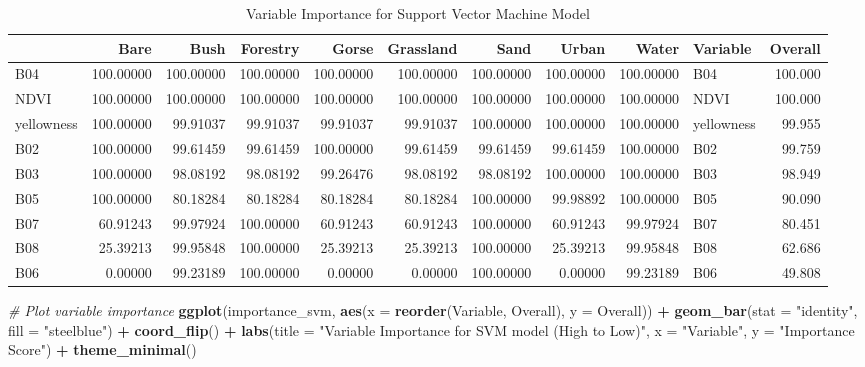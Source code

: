 \documentclass[
]{article}
\newenvironment{Shaded}{\begin{snugshade}}{\end{snugshade}}
\newcommand{\AttributeTok}[1]{\textcolor[rgb]{0.13,0.29,0.53}{#1}}
\newcommand{\CommentTok}[1]{\textcolor[rgb]{0.56,0.35,0.01}{\textit{#1}}}
\newcommand{\FunctionTok}[1]{\textcolor[rgb]{0.13,0.29,0.53}{\textbf{#1}}}
\newcommand{\NormalTok}[1]{#1}
\newcommand{\SpecialCharTok}[1]{\textcolor[rgb]{0.81,0.36,0.00}{\textbf{#1}}}
\newcommand{\StringTok}[1]{\textcolor[rgb]{0.31,0.60,0.02}{#1}}
\begin{document}
\begin{longtable}[l]{lrrrrrrrrlr}
\caption{\label{tab:svm_summary}Variable Importance for Support Vector Machine Model}\\
\toprule
 & Bare & Bush & Forestry & Gorse & Grassland & Sand & Urban & Water & Variable & Overall\\
\midrule
B04 & 100.00000 & 100.00000 & 100.00000 & 100.00000 & 100.00000 & 100.00000 & 100.00000 & 100.00000 & B04 & 100.000\\
NDVI & 100.00000 & 100.00000 & 100.00000 & 100.00000 & 100.00000 & 100.00000 & 100.00000 & 100.00000 & NDVI & 100.000\\
yellowness & 100.00000 & 99.91037 & 99.91037 & 99.91037 & 99.91037 & 100.00000 & 100.00000 & 100.00000 & yellowness & 99.955\\
B02 & 100.00000 & 99.61459 & 99.61459 & 100.00000 & 99.61459 & 99.61459 & 99.61459 & 100.00000 & B02 & 99.759\\
B03 & 100.00000 & 98.08192 & 98.08192 & 99.26476 & 98.08192 & 98.08192 & 100.00000 & 100.00000 & B03 & 98.949\\
\addlinespace
B05 & 100.00000 & 80.18284 & 80.18284 & 80.18284 & 80.18284 & 100.00000 & 99.98892 & 100.00000 & B05 & 90.090\\
B07 & 60.91243 & 99.97924 & 100.00000 & 60.91243 & 60.91243 & 100.00000 & 60.91243 & 99.97924 & B07 & 80.451\\
B08 & 25.39213 & 99.95848 & 100.00000 & 25.39213 & 25.39213 & 100.00000 & 25.39213 & 99.95848 & B08 & 62.686\\
B06 & 0.00000 & 99.23189 & 100.00000 & 0.00000 & 0.00000 & 100.00000 & 0.00000 & 99.23189 & B06 & 49.808\\
\bottomrule
\end{longtable}

\begin{Shaded}
\begin{Highlighting}[]
\CommentTok{\# Plot variable importance}
\FunctionTok{ggplot}\NormalTok{(importance\_svm, }\FunctionTok{aes}\NormalTok{(}\AttributeTok{x =} \FunctionTok{reorder}\NormalTok{(Variable, Overall), }\AttributeTok{y =}\NormalTok{ Overall)) }\SpecialCharTok{+}
  \FunctionTok{geom\_bar}\NormalTok{(}\AttributeTok{stat =} \StringTok{"identity"}\NormalTok{, }\AttributeTok{fill =} \StringTok{"steelblue"}\NormalTok{) }\SpecialCharTok{+}
  \FunctionTok{coord\_flip}\NormalTok{() }\SpecialCharTok{+}
  \FunctionTok{labs}\NormalTok{(}\AttributeTok{title =} \StringTok{"Variable Importance for SVM model (High to Low)"}\NormalTok{,}
       \AttributeTok{x =} \StringTok{"Variable"}\NormalTok{, }\AttributeTok{y =} \StringTok{"Importance Score"}\NormalTok{) }\SpecialCharTok{+}
  \FunctionTok{theme\_minimal}\NormalTok{()}
\end{Highlighting}
\end{Shaded}
\end{document}
